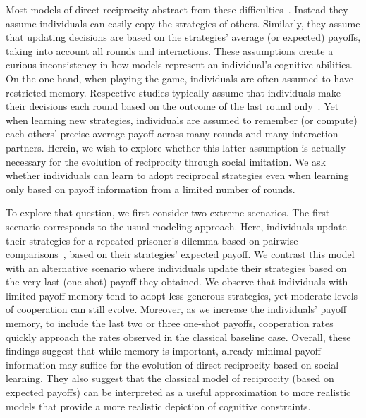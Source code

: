 \documentclass[11pt]{article}
\theoremstyle{plainCl1}
\theoremstyle{plainCl2}
\begin{document}
Most models of direct reciprocity abstract from these difficulties~\citep{brauchli:JTB:1999,brandt:JTB:2006,ohtsuki:JTB:2007b,szolnoki:pre:2009b,imhof2010stochastic,van-segbroeck:prl:2012,grujic:jtb:2012,Martinez2012,stewart:pnas:2013,pinheiro:PLoSCB:2014,stewart:games:2015,Baek2016,McAvoy:ProcA:2019,glynatsi:SCR:2020,Schmid:PlosCB:2022,Murase:SciRep:2022}. 
Instead they assume individuals can easily copy the strategies of others. 
Similarly, they assume that updating decisions are based on the strategies' average (or expected) payoffs, taking into account all rounds and interactions. 
These assumptions create a curious inconsistency in how models represent an individual's cognitive abilities. 
On the one hand, when playing the game, individuals are often assumed to have restricted memory. 
Respective studies typically assume that individuals make their decisions each round based on the outcome of the last round only~\citep[with only a few exceptions, see Refs.][]{Hauert1997,van-veelen:PNAS:2012,Stewart2016,Li:NatCS:2022,Murase:PLoSCompBio:2023a}. 
Yet when learning new strategies, individuals are assumed to remember (or compute) each others' precise average payoff across many rounds and many interaction partners. 
Herein, we wish to explore whether this latter assumption is actually necessary for the evolution of reciprocity through social imitation. 
We ask whether individuals can learn to adopt reciprocal strategies even when learning only based on payoff information from a limited number of rounds. 



To explore that question, we first consider two extreme scenarios. 
The first scenario corresponds to the usual modeling approach. 
Here, individuals update their strategies for a repeated prisoner's dilemma based on pairwise comparisons~\cite{traulsen2007pairwise}, based on their strategies' expected payoff. 
We contrast this model with an alternative scenario where individuals update their strategies based on the very
last (one-shot) payoff they obtained. 
We observe that individuals with limited payoff memory tend to adopt less generous strategies, yet moderate levels of cooperation can still evolve. 
Moreover, as we increase the individuals' payoff memory, to include the last two or three one-shot payoffs, cooperation rates quickly approach the rates observed in the classical baseline case. 
Overall, these findings suggest that while memory is important, already minimal payoff information may suffice for the evolution of direct reciprocity based on social learning. 
They also suggest that the classical model of reciprocity (based on expected payoffs) can be interpreted as a useful approximation to more realistic models that provide a more realistic depiction of cognitive constraints. 
\end{document}
